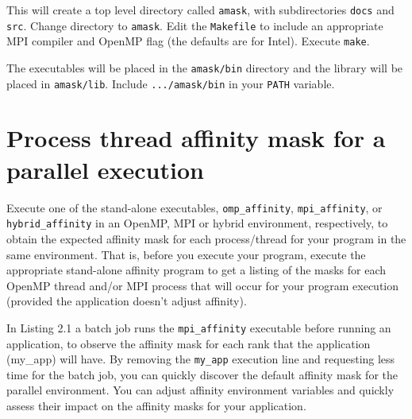 \documentclass[10pt,a4paper]{report}
\begin{document}
This will create a top level directory called \verb+amask+, with subdirectories 
\verb+docs+ and \verb+src+.  Change directory to  \verb+amask+. Edit the \verb+Makefile+ to include an appropriate
MPI compiler and OpenMP flag (the defaults are for Intel).  Execute \verb+make+.





The executables will be placed in the \verb+amask/bin+ directory and the library 
will be placed in \verb+amask/lib+. Include \verb+.../amask/bin+ in your \verb+PATH+ variable.

\FloatBarrier
\chapter{Process thread affinity mask for a parallel execution}


Execute one of the stand-alone executables, \verb+omp_affinity+, \verb+mpi_affinity+, or
\verb+hybrid_affinity+ in an OpenMP, MPI or hybrid environment, 
respectively, to obtain the expected affinity mask for each 
process/thread for your program in the same environment.  That is,
before you execute your program, execute the appropriate stand-alone affinity
program to get a listing of the masks for each OpenMP thread and/or MPI process
that will occur for your program execution (provided the application doesn't adjust affinity).

In Listing 2.1
a batch job runs the \verb+mpi_affinity+ executable before running an application, to observe
the affinity mask for each rank that the application (my\_app) will have.
By removing the \verb+my_app+ execution line and requesting less time for the batch job, you
can quickly discover the default affinity mask for the parallel environment. 
You can adjust affinity environment variables and quickly assess their impact on 
the affinity masks for your application.  
\end{document}
